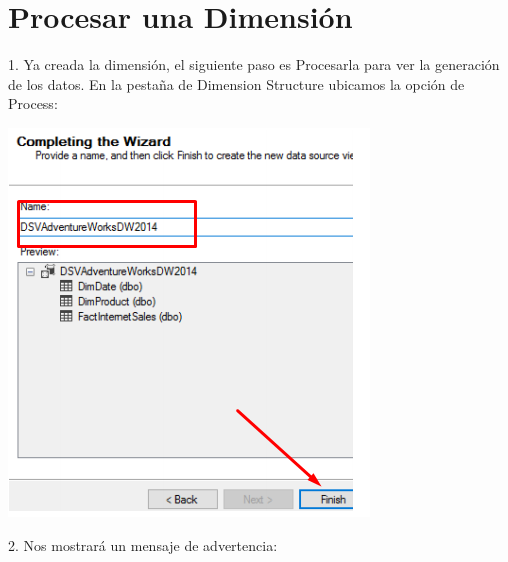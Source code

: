 \section{Procesar una Dimensión} 

1. Ya creada la dimensión, el siguiente paso es Procesarla para ver la generación de los datos. En la pestaña
de Dimension Structure ubicamos la opción de Process:

	\begin{center}
	\includegraphics[width=\columnwidth]{images/task2/img13}
	\end{center}	

2. Nos mostrará un mensaje de advertencia:

